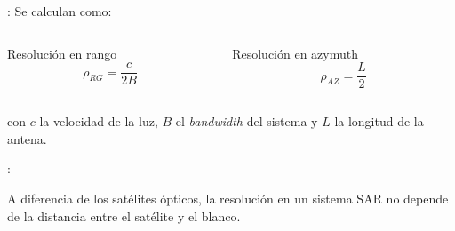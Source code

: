 \begin{frame}{\secname : \subsecname}
  Se calculan como:
    \begin{columns}
    \begin{column}{0.5\textwidth}
     \begin{block}{Resolución en rango}
      \begin{equation}
        \rho_{RG} = \frac{c}{2B}
      \end{equation}
     \end{block}
    \end{column}
    \begin{column}{0.5\textwidth}  %
      \begin{block}{Resolución en azymuth}
        \begin{equation}
          \rho_{AZ} = \frac{L}{2}
        \end{equation}
      \end{block}
    \end{column}
    \end{columns}
    con $c$ la velocidad de la luz, $B$ el \emph{bandwidth} del sistema y $L$ la longitud de la antena.
\end{frame}

\begin{frame}{\secname : \subsecname}
  \begin{block}[Observación:]
    A diferencia de los satélites ópticos, la resolución en un sistema SAR no depende de la distancia entre el satélite y el blanco.
  \end{block}
\end{frame}
